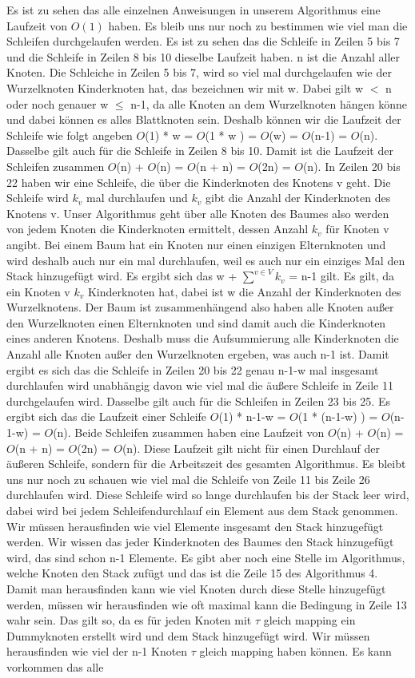 Es ist zu sehen das alle einzelnen Anweisungen in unserem Algorithmus eine Laufzeit von $O(1)$ haben. Es bleib uns nur noch zu bestimmen wie viel man die Schleifen durchgelaufen werden. Es ist zu sehen das die Schleife in Zeilen 5 bis 7 und die Schleife in Zeilen 8 bis 10 dieselbe Laufzeit haben. n ist die Anzahl aller Knoten. Die Schleiche in Zeilen 5 bis 7, wird so viel mal durchgelaufen wie der Wurzelknoten Kinderknoten hat, das bezeichnen wir mit w. Dabei gilt w $<$ n oder noch genauer w $\leq$ n-1, da alle Knoten an dem Wurzelknoten hängen könne und dabei können es alles Blattknoten sein. Deshalb können wir die Laufzeit der Schleife wie folgt angeben $O$(1) * w = $O$(1 * w ) = $O$(w) = $O$(n-1) = $O$(n). Dasselbe gilt auch für die Schleife in Zeilen 8 bis 10. Damit ist die Laufzeit der Schleifen zusammen $O$(n) + $O$(n) = $O$(n + n) = $O$(2n) = $O$(n). In Zeilen 20 bis 22 haben wir eine Schleife, die über die Kinderknoten des Knotens v geht. Die Schleife wird $k_v$ mal durchlaufen und $k_v$ gibt die Anzahl der Kinderknoten des Knotens v. Unser Algorithmus geht über alle Knoten des Baumes also werden von jedem Knoten die Kinderknoten ermittelt, dessen Anzahl $k_v$ für Knoten v angibt. Bei einem Baum hat ein Knoten nur einen einzigen Elternknoten und wird deshalb auch nur ein mal durchlaufen, weil es auch nur ein einziges Mal den Stack hinzugefügt wird. Es ergibt sich das w + $\sum^{v \in V} k_v$ = n-1 gilt. Es gilt, da ein Knoten v $k_v$ Kinderknoten hat, dabei ist w die Anzahl der Kinderknoten des Wurzelknotens. Der Baum ist zusammenhängend also haben alle Knoten außer den Wurzelknoten einen Elternknoten und sind damit auch die Kinderknoten eines anderen Knotens. Deshalb muss die Aufsummierung alle Kinderknoten die Anzahl alle Knoten außer den Wurzelknoten ergeben, was auch n-1 ist. Damit ergibt es sich das die Schleife in Zeilen 20 bis 22 genau n-1-w mal insgesamt durchlaufen wird unabhängig davon wie viel mal die äußere Schleife in Zeile 11 durchgelaufen wird. Dasselbe gilt auch für die Schleifen in Zeilen 23 bis 25. Es ergibt sich das die Laufzeit einer Schleife $O$(1) * n-1-w = $O$(1 * (n-1-w) ) = $O$(n-1-w) = $O$(n). Beide Schleifen zusammen haben eine Laufzeit von $O$(n) + $O$(n) = $O$(n + n) = $O$(2n) = $O$(n). Diese Laufzeit gilt nicht für einen Durchlauf der äußeren Schleife, sondern für die Arbeitszeit des gesamten Algorithmus. Es bleibt uns nur noch zu schauen wie viel mal die Schleife von Zeile 11 bis Zeile 26 durchlaufen wird. Diese Schleife wird so lange durchlaufen bis der Stack leer wird, dabei wird bei jedem Schleifendurchlauf ein Element aus dem Stack genommen. Wir müssen herausfinden wie viel Elemente insgesamt den Stack hinzugefügt werden. Wir wissen das jeder Kinderknoten des Baumes den Stack hinzugefügt wird, das sind schon n-1 Elemente. Es gibt aber noch eine Stelle im Algorithmus, welche Knoten den Stack zufügt und das ist die Zeile 15 des Algorithmus 4. Damit man herausfinden kann wie viel Knoten durch diese Stelle hinzugefügt werden, müssen wir herausfinden wie oft maximal kann die Bedingung in Zeile 13 wahr sein. Das gilt so, da es für jeden Knoten mit $\tau$ gleich mapping ein Dummyknoten erstellt wird und dem Stack hinzugefügt wird. Wir müssen herausfinden wie viel der n-1 Knoten $\tau$ gleich mapping haben können. Es kann vorkommen das alle 